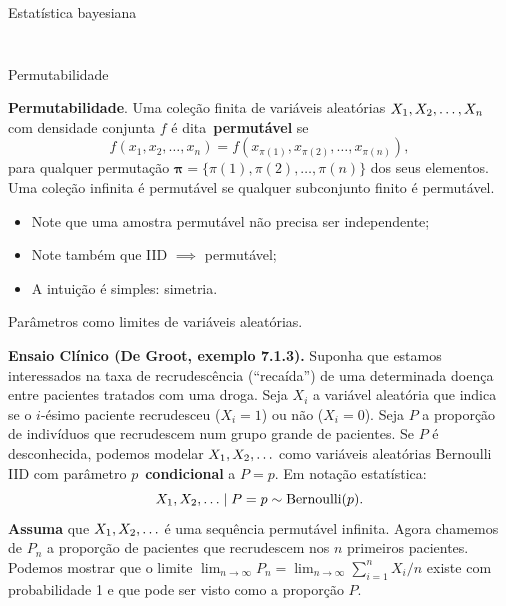 \begin{frame}{Estatística bayesiana}
\begin{columns}
\begin{column}{0.5\textwidth}
\begin{figure}[!ht]
\begin{center}
    \end{center} 
    \end{figure} 
\end{column}
  \end{columns}  
\end{frame}
\begin{frame}{Permutabilidade}
\begin{defn}
\label{def:exchangeability}
 \textbf{Permutabilidade}.
 Uma coleção finita de variáveis aleatórias $X_1, X_2, \ldots, X_n$ com densidade conjunta $f$ é dita~\textbf{permutável} se 
 \[f(x_1, x_2, \ldots, x_n) = f( x_{\pi(1)}, x_{\pi(2)}, \ldots, x_{\pi(n)} ), \]
 para qualquer permutação $\boldsymbol\pi = \{\pi(1), \pi(2), \ldots, \pi(n)\}$ dos seus elementos.
 Uma coleção infinita é permutável se qualquer subconjunto finito é permutável.
\end{defn}
\begin{itemize}
 \item Note que uma amostra permutável não precisa ser independente;
 \item Note também que IID $\implies$ permutável;
 \item A intuição é simples: simetria.
\end{itemize}
\end{frame}
\begin{frame}{Parâmetros como limites de variáveis aleatórias.}
\begin{exemplo}
\label{ex:remission}
 \textbf{Ensaio Clínico (De Groot, exemplo 7.1.3).}
 Suponha que estamos interessados na taxa de recrudescência (``recaída'') de uma determinada doença entre pacientes tratados com uma droga.
 Seja $X_i$ a variável aleatória que indica se o $i$-ésimo paciente recrudesceu ($X_i = 1$) ou não ($X_i = 0$).
 Seja $P$ a proporção de indivíduos que recrudescem num grupo grande de pacientes. 
 Se $P$ é desconhecida, podemos modelar $X_1, X_2, \ldots$ como variáveis aleatórias Bernoulli IID com parâmetro $p$~\textbf{condicional} a $P = p$.
 Em notação estatística:
 \[ X_1, X_2, \ldots \mid P = p \sim \operatorname{Bernoulli}(p).\]
  \textbf{Assuma} que $X_1, X_2, \ldots$ é uma sequência permutável infinita.
  Agora chamemos de $P_n$ a proporção de pacientes que recrudescem nos $n$ primeiros pacientes.
  Podemos mostrar que o limite $\lim_{n \to \infty} P_n = \lim_{n \to \infty} \sum_{i=1}^n X_i/n$ existe com probabilidade 1 e que pode ser visto como a proporção $P$.
\end{exemplo}
\end{frame}
